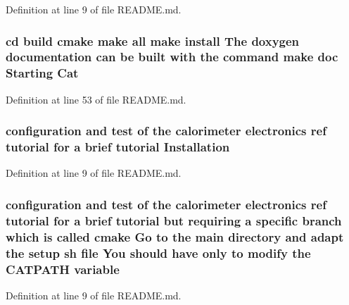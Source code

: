 Definition at line 9 of file README.md.\hypertarget{README_8md_a42ba74587490858a93b849de135dfa64}{
\subsubsection[{Cat}]{\setlength{\rightskip}{0pt plus 5cm}cd {\bf build} cmake make all make install The doxygen documentation can be built with the command make doc Starting {\bf Cat}}}
\label{README_8md_a42ba74587490858a93b849de135dfa64}


Definition at line 53 of file README.md.\hypertarget{README_8md_a9b652498336c8f96f76b340ed2fdee76}{
\subsubsection[{Installation}]{\setlength{\rightskip}{0pt plus 5cm}configuration and test of the calorimeter electronics ref tutorial for a brief tutorial {\bf Installation}}}
\label{README_8md_a9b652498336c8f96f76b340ed2fdee76}


Definition at line 9 of file README.md.\hypertarget{README_8md_aa9be1efea44c73a389d100be792af698}{
\subsubsection[{variable}]{\setlength{\rightskip}{0pt plus 5cm}configuration and test of the calorimeter electronics ref tutorial for a brief tutorial but requiring a specific branch which is called cmake Go to the main directory and adapt the setup sh file You should have only to modify the CATPATH {\bf variable}}}
\label{README_8md_aa9be1efea44c73a389d100be792af698}


Definition at line 9 of file README.md.